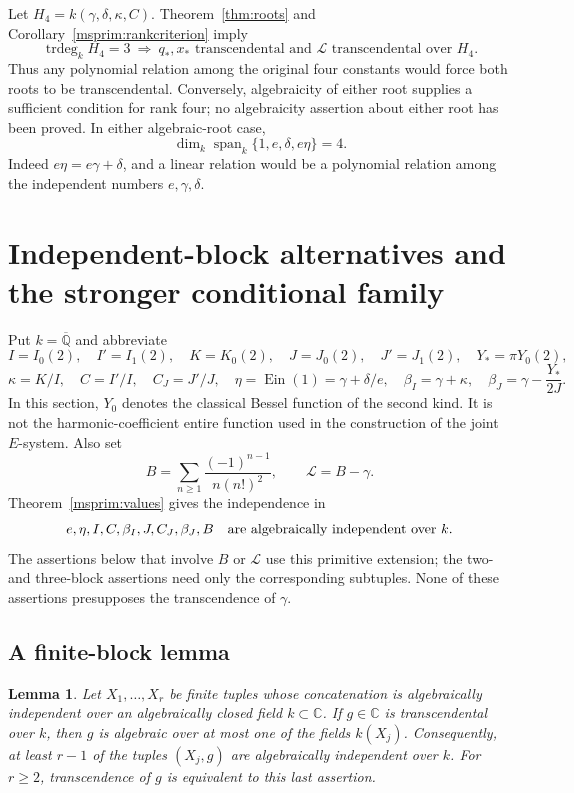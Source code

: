\documentclass[11pt]{article}
\newtheorem{lemma}[theorem]{Lemma}
\theoremstyle{definition}
\theoremstyle{remark}
\newcommand{\trdeg}{\operatorname{trdeg}}
\newcommand{\Ein}{\operatorname{Ein}}
\begin{document}
Let $H_4=k(\gamma,\delta,\kappa,C)$.
Theorem~\ref{thm:roots} and Corollary~\ref{msprim:rankcriterion} imply
\[
 \trdeg_k H_4=3\ \Longrightarrow\
 q_*,x_*\text{ transcendental and }\mathcal L\text{ transcendental over }H_4.
\]
Thus any polynomial relation among the original four constants
would force both roots to be transcendental. Conversely, algebraicity
of either root supplies a sufficient condition for rank four;
no algebraicity assertion about either root has been proved.
In either algebraic-root case,
\[
 \dim_k\operatorname{span}_k\{1,e,\delta,e\eta\}=4.
\]
Indeed $e\eta=e\gamma+\delta$, and a linear relation would be a
polynomial relation among the independent numbers $e,\gamma,\delta$.



\section{Independent-block alternatives and the stronger conditional family}
\label{gs:section}

Put $k=\overline{\mathbb Q}$ and abbreviate
\[
 I=I_0(2),\quad I'=I_1(2),\quad K=K_0(2),\quad
 J=J_0(2),\quad J'=J_1(2),\quad Y_*=\pi Y_0(2),
\]
\[
 \kappa=K/I,\quad C=I'/I,\quad C_J=J'/J,\quad
 \eta=\Ein(1)=\gamma+\delta/e,
 \quad \beta_I=\gamma+\kappa,\quad
 \beta_J=\gamma-\frac{Y_*}{2J}.
\]
In this section, $Y_0$ denotes the classical Bessel function of the
second kind. It is not the harmonic-coefficient entire function used
in the construction of the joint $E$-system. Also set
\[
 B=\sum_{n\ge1}\frac{(-1)^{n-1}}{n(n!)^2},\qquad
 \mathcal L=B-\gamma.
\]
Theorem~\ref{msprim:values} gives the independence in
\begin{equation}\label{gs:joint-nine}
 e,\eta,I,C,\beta_I,J,C_J,\beta_J,B
 \quad\hbox{are algebraically independent over }k.
\end{equation}
The assertions below that involve $B$ or $\mathcal L$ use this primitive
extension; the two- and three-block assertions need only the
corresponding subtuples. None of these assertions presupposes the
transcendence of $\gamma$.

\subsection{A finite-block lemma}

\begin{lemma}\label{gs:block-lemma}
Let $X_1,\ldots,X_r$ be finite tuples whose concatenation is
algebraically independent over an algebraically closed field
$k\subset\mathbb C$. If $g\in\mathbb C$ is transcendental over $k$,
then $g$ is algebraic over at most one of the fields $k(X_j)$.
Consequently, at least $r-1$ of the tuples $(X_j,g)$ are algebraically
independent over $k$.
For $r\ge2$, transcendence of $g$ is equivalent to this last assertion.
\end{lemma}
\end{document}
